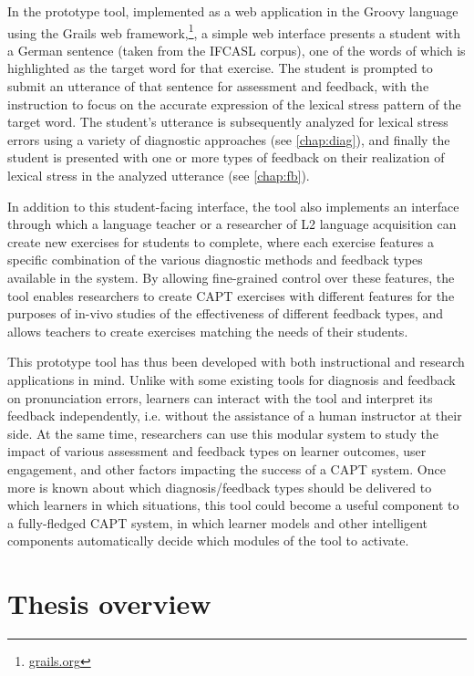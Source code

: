 In the prototype tool, implemented as a web application in the Groovy language using the Grails web framework,\footnote{\url{grails.org}}, a simple web interface presents a student with a German sentence (taken from the IFCASL corpus), one of the words of which is highlighted as the target word for that exercise. The student is prompted to submit an utterance of that sentence for assessment and feedback, with the instruction to focus on the accurate expression of the lexical stress pattern of the target word. The student's utterance is subsequently analyzed for lexical stress errors using a variety of diagnostic approaches (see \cref{chap:diag}), and finally the student is presented with one or more types of feedback on their realization of lexical stress in the analyzed utterance (see \cref{chap:fb}).  

In addition to this student-facing interface, the tool also implements an interface through which a language teacher or a researcher of L2 language acquisition can create new exercises for students to complete, where each exercise features a specific combination of the various diagnostic methods and feedback types available in the system. By allowing fine-grained control over these features, the tool enables researchers to create CAPT exercises with different features for the purposes of in-vivo studies of the effectiveness of different feedback types, and allows teachers to create exercises matching the needs of their students.


This prototype tool has thus been developed with both instructional and research applications in mind.
Unlike with some existing tools for diagnosis and feedback on pronunciation errors, learners can interact with the tool and interpret its feedback independently, i.e. without the assistance of a human instructor at their side.
At the same time, researchers can use this modular system to study the impact of various assessment and feedback types on learner outcomes, user engagement, and other factors impacting the success of a CAPT system. 
%
Once more is known about which diagnosis/feedback types should be delivered to which learners in which situations, this tool could become a useful component to a fully-fledged CAPT system, in which learner models and other intelligent components automatically decide which modules of the tool to activate. 



\section{Thesis overview}
\label{sec:intro:overview}

